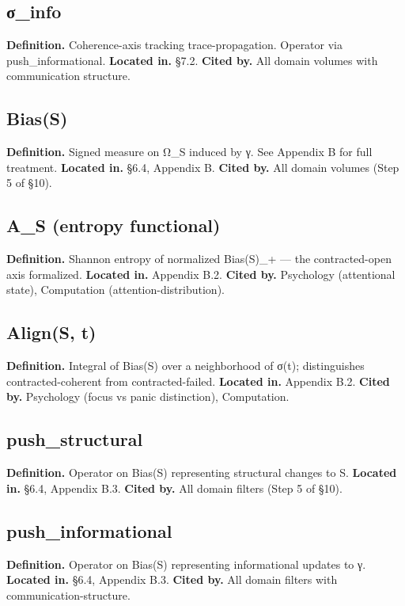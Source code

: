 \documentclass[11pt, openany]{book}
\begin{document}
\subsection{σ\_\allowbreak{}info}
\textbf{Definition.} Coherence-axis tracking trace-propagation. Operator via push\_\allowbreak{}informational.
\textbf{Located in.} §7.2.
\textbf{Cited by.} All domain volumes with communication structure.

\subsection{Bias(S)}
\textbf{Definition.} Signed measure on Ω\_\allowbreak{}S induced by γ. See Appendix B for full treatment.
\textbf{Located in.} §6.4, Appendix B.
\textbf{Cited by.} All domain volumes (Step 5 of §10).

\subsection{A\_\allowbreak{}S (entropy functional)}
\textbf{Definition.} Shannon entropy of normalized Bias(S)\_\allowbreak{}+ --- the contracted-open axis formalized.
\textbf{Located in.} Appendix B.2.
\textbf{Cited by.} Psychology (attentional state), Computation (attention-distribution).

\subsection{Align(S, t)}
\textbf{Definition.} Integral of Bias(S) over a neighborhood of σ(t); distinguishes contracted-coherent from contracted-failed.
\textbf{Located in.} Appendix B.2.
\textbf{Cited by.} Psychology (focus vs panic distinction), Computation.

\subsection{push\_\allowbreak{}structural}
\textbf{Definition.} Operator on Bias(S) representing structural changes to S.
\textbf{Located in.} §6.4, Appendix B.3.
\textbf{Cited by.} All domain filters (Step 5 of §10).

\subsection{push\_\allowbreak{}informational}
\textbf{Definition.} Operator on Bias(S) representing informational updates to γ.
\textbf{Located in.} §6.4, Appendix B.3.
\textbf{Cited by.} All domain filters with communication-structure.
\end{document}
